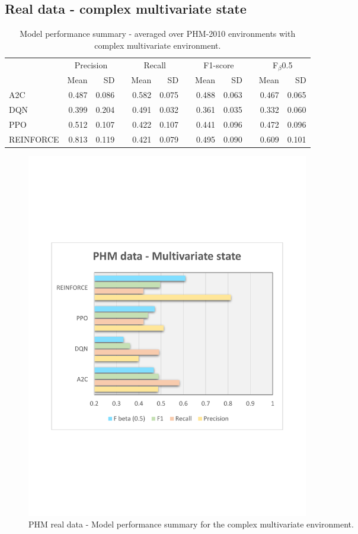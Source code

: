 \documentclass[a4paper, 12pt]{article}
\newcommand{\rowspace}[1]{\renewcommand{\arraystretch}{#1}}
\begin{document}
\subsection{Real data - complex multivariate state}
\begin{table}[!htb]\centering
	\sffamily
	\rowspace{1.3}
	\begin{tabular}{@{}l rr c rr c rr c rr@{}}
		\arrayrulecolor{black!40}\toprule
		& \multicolumn{2}{c}{Precision} & \phantom{i} & \multicolumn{2}{c}{Recall} & \phantom{i} & \multicolumn{2}{c}{F1-score} & \phantom{i} & \multicolumn{2}{c}{F$_\beta$0.5} \\
		\cmidrule{2-3} \cmidrule{5-6} \cmidrule{8-9} \cmidrule{11-12} 
		
		&Mean &SD & &Mean &SD & &Mean &SD& &Mean & SD\\ \midrule
		A2C & 0.487 & 0.086 & &\textcolor{dblue}{0.582} & 0.075 & & 0.488 & 0.063 & &0.467 &0.065 \\
		DQN & 0.399 & 0.204 & &0.491 & 0.032 & & 0.361 & 0.035 & &0.332 &0.060 \\
		PPO & 0.512 & 0.107 & &0.422 & 0.107 & & 0.441 & 0.096 & &0.472 &0.096 \\
		REINFORCE & \textcolor{dblue}{0.813} & 0.119 & &0.421 & 0.079 & & \textcolor{dblue}{0.495} & 0.090 & &\textcolor{dblue}{0.609} &0.101 \\
		\bottomrule
	\end{tabular}
	\caption{Model performance summary - averaged over PHM-2010 environments with complex multivariate environment.}
	\label{tbl:PHMMS}
\end{table}
\begin{figure}[h]
	\centering
	\includegraphics[width=0.6\textwidth, trim={1.5cm 7cm 1cm 7cm}]{images/PHMMSPlot.pdf}  
	\caption{PHM real data - Model performance summary for the complex multivariate environment.}
	\label{fig:PHMMS}
\end{figure}
\end{document}
